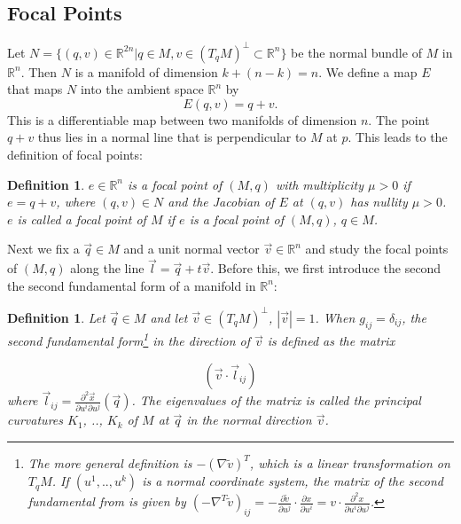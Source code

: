 \documentclass[a4paper,11pt,reqno]{amsart}
\newtheorem{defn}[thm]{Definition}
\newcommand{\RR}{\mathbb{R}}      %
\newcommand{\vect}[1]{\vec{#1}}
\begin{document}
\subsection{Focal Points}

Let $N = \{ (q,v) \in \RR^{2n} | q \in M, v \in (T_qM)^{\perp} \subset \RR^n \}$
be the normal bundle of $M$ in $\RR^n$. Then $N$ is a manifold of dimension
$k+(n-k)=n$. We define a map $E$ that maps $N$ into the ambient space $\RR^n$ by
\begin{equation}
  E(q, v) = q + v.
\end{equation}
This is a differentiable map between two manifolds of dimension $n$. The point
$q+v$ thus lies in a normal line that is perpendicular to $M$ at $p$. This leads
to the definition of focal points:

\begin{defn}
  $e \in \RR^n$ is a focal point of $(M, q)$ with multiplicity $\mu > 0$ if $e =
  q+v$, where $(q, v) \in N$ and the Jacobian of $E$ at $(q, v)$ has nullity
  $\mu > 0$. $e$ is called a focal point of $M$ if $e$ is a focal point of $(M,
  q)$, $q \in M$.
\end{defn}

Next we fix a $\vect{q} \in M$ and a unit normal vector $\vect{v} \in \RR^n$ and
study the focal points of $(M, q)$ along the line $\vect{l} =
\vect{q}+t\vect{v}$. Before this, we first introduce the second the second
fundamental form of a manifold in $\RR^n$:

\begin{defn}
  Let $\vect{q} \in M$ and let $\vect{v} \in (T_qM)^\perp$, $|\vect{v}| =
  1$. When $g_{ij} = \delta_{ij}$, the second fundamental form\footnote{The more
    general definition is $-(\nabla \tilde{v})^T$, which is a linear
    transformation on $T_qM$. If $(u^1, .., u^k)$ is a normal coordinate system,
    the matrix of the second fundamental from is given by $(-\nabla^T
    \tilde{v})_{ij} = -\frac{\partial \tilde{v}}{\partial u^j} \cdot
    \frac{\partial x}{\partial u^i} = v \cdot \frac{\partial^2 x}{\partial
      u^i \partial u^j}$.} in the direction of $\vect{v}$ is defined as the
  matrix

  \begin{equation}
    \left(
      \vect{v} \cdot \vect{l}_{ij}
    \right)
  \end{equation}
  where $\vect{l}_{ij} = \frac{\partial^2 \vect{x}}{\partial u^i \partial
    u^j}(\vect{q})$.
  The eigenvalues of the matrix is called the principal curvatures $K_1$, ..,
  $K_k$ of $M$ at $\vect{q}$ in the normal direction $\vect{v}$.
\end{defn}
\end{document}
